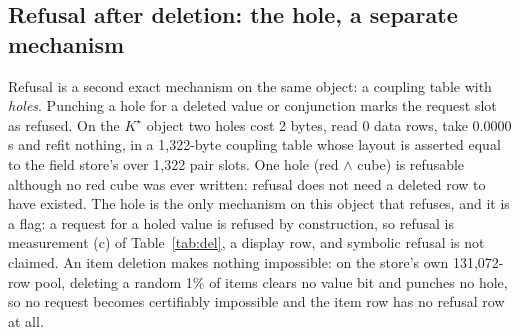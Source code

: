 \documentclass{article} %
\newcommand{\Kstar}{\ensuremath{K^{\star}}}
\begin{document}
\subsection{Refusal after deletion: the hole, a separate mechanism}
\label{sec:hole}

Refusal is a second exact mechanism on the same object: a coupling table with \emph{holes}.
Punching a hole for a deleted value or conjunction marks the request slot as refused. On the
$\Kstar$ object two holes cost 2 bytes, read 0 data rows, take 0.0000 s and refit nothing, in
a 1,322-byte coupling table whose layout is asserted equal to the field store's over 1,322 pair
slots. %
One hole (red $\wedge$ cube) is refusable although no red cube was ever written: refusal does
not need a deleted row to have existed. %
The hole is the only mechanism on this object that refuses, and it is a flag: a request for a
holed value is refused by construction, so refusal is measurement (c) of Table~\ref{tab:del}, a
display row, and symbolic refusal is not claimed. An item deletion makes nothing impossible: on the store's own 131,072-row pool, deleting a random
1\% of items clears no value bit and punches no hole, so no request becomes certifiably impossible
and the item row has no refusal row at all. %
\end{document}
